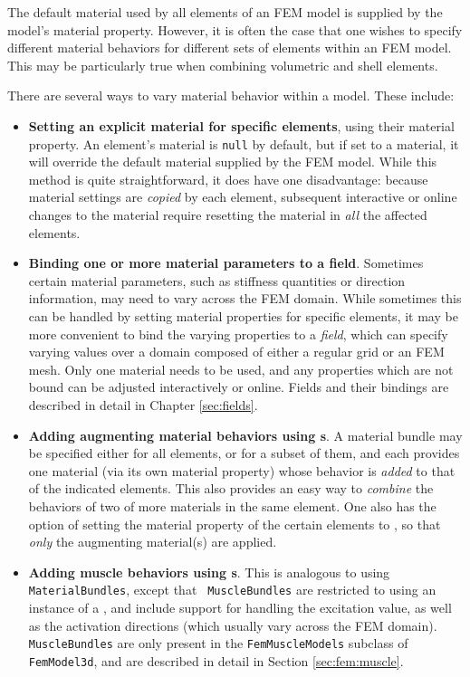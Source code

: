 The default material used by all elements of an FEM model is supplied
by the model's {\sf material} property.  However, it is often the case
that one wishes to specify different material behaviors for
different sets of elements within an FEM model. This may be
particularly true when combining volumetric and shell elements.

There are several ways to vary material behavior within a model.
These include:

\begin{itemize}

\item {\bf Setting an explicit material for specific elements}, using
their {\sf material} property.  An element's material is {\tt null} by
default, but if set to a material, it will override the
default material supplied by the FEM model. While this method is quite
straightforward, it does have one disadvantage: because material
settings are {\it copied} by each element, subsequent interactive or
online changes to the material require resetting the material in {\it all}
the affected elements.

\item {\bf Binding one or more material parameters to a field}.
Sometimes certain material parameters, such as stiffness quantities or
direction information, may need to vary across the FEM domain.  While
sometimes this can be handled by setting material properties for
specific elements, it may be more convenient to bind the varying
properties to a {\it field}, which can specify varying values over a
domain composed of either a regular grid or an FEM mesh.  Only one
material needs to be used, and any properties which are not bound can
be adjusted interactively or online. Fields and their bindings are described in detail in Chapter \ref{sec:fields}.

\item {\bf Adding augmenting material behaviors using 
s}.  A material
bundle may be specified either for all elements, or for a subset of
them, and each provides one material (via its own {\sf material}
property) whose behavior is {\it added} to that of the indicated
elements. This also provides an easy way to {\it combine} the
behaviors of two of more materials in the same element.  One also has
the option of setting the {\sf material} property of the certain
elements to , so
that {\it only} the augmenting material(s) are applied.

\item {\bf Adding muscle behaviors using 
s}. This
is analogous to using {\tt MaterialBundles}, except that {\tt
MuscleBundles} are restricted to using an instance of
a , and include
support for handling the excitation value, as well as the activation
directions (which usually vary across the FEM domain). {\tt
MuscleBundles} are only present in the {\tt FemMuscleModels} subclass
of {\tt FemModel3d}, and are described in detail in
Section \ref{sec:fem:muscle}.

\end{itemize}

